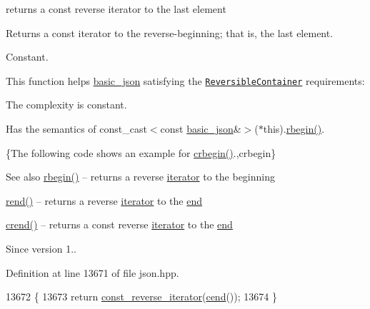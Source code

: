 returns a const reverse iterator to the last element 

Returns a const iterator to the reverse-\/beginning; that is, the last element.

  Constant.

This function helps {\ttfamily \hyperlink{classnlohmann_1_1basic__json}{basic\+\_\+json}} satisfying the \href{http://en.cppreference.com/w/cpp/concept/ReversibleContainer}{\tt Reversible\+Container} requirements\+:
\begin{DoxyItemize}
\item The complexity is constant.
\item Has the semantics of {\ttfamily const\+\_\+cast$<$const \hyperlink{classnlohmann_1_1basic__json}{basic\+\_\+json}\&$>$($\ast$this).\hyperlink{classnlohmann_1_1basic__json_a1ef93e2006dbe52667294f5ef38b0b10}{rbegin()}}.
\end{DoxyItemize}

\{The following code shows an example for {\ttfamily \hyperlink{classnlohmann_1_1basic__json_a1e0769d22d54573f294da0e5c6abc9de}{crbegin()}}.,crbegin\}

\begin{DoxySeeAlso}{See also}
\hyperlink{classnlohmann_1_1basic__json_a1ef93e2006dbe52667294f5ef38b0b10}{rbegin()} -- returns a reverse \hyperlink{classnlohmann_1_1basic__json_a099316232c76c034030a38faa6e34dca}{iterator} to the beginning 

\hyperlink{classnlohmann_1_1basic__json_ac77aed0925d447744676725ab0b6d535}{rend()} -- returns a reverse \hyperlink{classnlohmann_1_1basic__json_a099316232c76c034030a38faa6e34dca}{iterator} to the \hyperlink{classnlohmann_1_1basic__json_a13e032a02a7fd8a93fdddc2fcbc4763c}{end} 

\hyperlink{classnlohmann_1_1basic__json_a5795b029dbf28e0cb2c7a439ec5d0a88}{crend()} -- returns a const reverse \hyperlink{classnlohmann_1_1basic__json_a099316232c76c034030a38faa6e34dca}{iterator} to the \hyperlink{classnlohmann_1_1basic__json_a13e032a02a7fd8a93fdddc2fcbc4763c}{end}
\end{DoxySeeAlso}
\begin{DoxySince}{Since}
version 1.. 
\end{DoxySince}


Definition at line 13671 of file json.\+hpp.


\begin{DoxyCode}
13672     \{
13673         \textcolor{keywordflow}{return} \hyperlink{classnlohmann_1_1basic__json_a72be3c24bfa24f0993d6c11af03e7404}{const\_reverse\_iterator}(\hyperlink{classnlohmann_1_1basic__json_a8dba7b7d2f38e6b0c614030aa43983f6}{cend}());
13674     \}
\end{DoxyCode}
\mbox{\label{classnlohmann_1_1basic__json_a81100399cf3e2be457937be7db3f5729}} 
